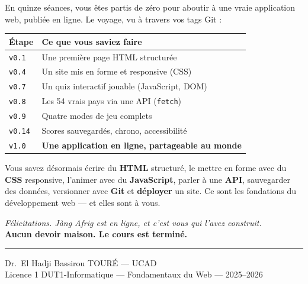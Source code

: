 \documentclass[11pt,a4paper]{article}
\newcommand{\code}[1]{\texttt{#1}}
\begin{document}
En quinze séances, vous êtes partis de zéro pour aboutir à une vraie application web, publiée en ligne. Le voyage, vu à travers vos tags Git :

\begin{center}
\begin{tabular}{ll}
\toprule
\textbf{Étape} & \textbf{Ce que vous saviez faire} \\
\midrule
\code{v0.1} & Une première page HTML structurée \\
\code{v0.4} & Un site mis en forme et responsive (CSS) \\
\code{v0.7} & Un quiz interactif jouable (JavaScript, DOM) \\
\code{v0.8} & Les 54 vrais pays via une API (\code{fetch}) \\
\code{v0.9} & Quatre modes de jeu complets \\
\code{v0.14} & Scores sauvegardés, chrono, accessibilité \\
\code{v1.0} & \textbf{Une application en ligne, partageable au monde} \\
\bottomrule
\end{tabular}
\end{center}

\medskip
Vous savez désormais écrire du \textbf{HTML} structuré, le mettre en forme avec du \textbf{CSS} responsive, l'animer avec du \textbf{JavaScript}, parler à une \textbf{API}, sauvegarder des données, versionner avec \textbf{Git} et \textbf{déployer} un site. Ce sont les fondations du développement web --- et elles sont à vous.

\begin{center}
\textit{Félicitations. Jàng Afrig est en ligne, et c'est vous qui l'avez construit.}\\[4pt]
\textbf{Aucun devoir maison. Le cours est terminé.}
\end{center}

\bigskip
\noindent\rule{\textwidth}{0.4pt}
\begin{center}
\small Dr.~El Hadji Bassirou TOURÉ --- UCAD\\
\small Licence 1 DUT1-Informatique --- Fondamentaux du Web --- 2025--2026
\end{center}
\end{document}
